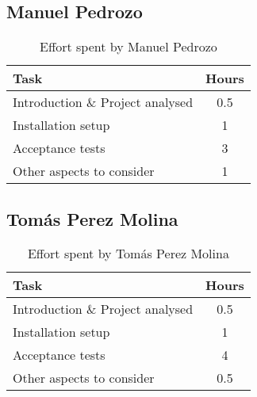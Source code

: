 \subsection{Manuel Pedrozo}

\begin{table}[H]
    \centering
    \begin{tabular}{|p{7cm}|c|}
    \hline
    \textbf{Task} & \textbf{Hours} \\ \hline
    Introduction \& Project analysed & 0.5 \\ \hline
    Installation setup & 1 \\ \hline
    Acceptance tests & 3 \\ \hline
    Other aspects to consider & 1 \\ \hline
    \end{tabular}
    \caption{\label{tbl:manuel-effort} Effort spent by Manuel Pedrozo}
    \end{table}

\subsection{Tomás Perez Molina}
\begin{table}[H]
    \centering
    \begin{tabular}{|p{7cm}|c|}
    \hline
    \textbf{Task} & \textbf{Hours} \\ \hline
    Introduction \& Project analysed & 0.5 \\ \hline
    Installation setup & 1 \\ \hline
    Acceptance tests & 4 \\ \hline
    Other aspects to consider & 0.5 \\ \hline
    \end{tabular}
    \caption{\label{tbl:tomas-effort} Effort spent by Tomás Perez Molina}
    \end{table}
